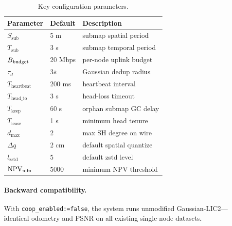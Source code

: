 \begin{table}[t]
  \centering
  \caption{Key configuration parameters.}
  \label{tab:config}
  \footnotesize
  \setlength{\tabcolsep}{3pt}
  \begin{tabular}{@{}p{2.2cm}p{1.1cm}p{4.5cm}@{}}
    \toprule
    Parameter & Default & Description \\
    \midrule
    $S_{\text{sub}}$       & 5 m    & submap spatial period \\
    $T_{\text{sub}}$       & 3 s    & submap temporal period \\
    $B_{\text{budget}}$             & 20 Mbps & per-node uplink budget \\
    $\tau_d$               & $3\bar{s}$ & Gaussian dedup radius \\
    $T_{\text{heartbeat}}$ & 200 ms & heartbeat interval \\
    $T_{\text{head\_to}}$  & 3 s    & head-loss timeout \\
    $T_{\text{keep}}$      & 60 s   & orphan submap GC delay \\
    $T_{\text{lease}}$     & 1 s    & minimum head tenure \\
    $d_{\max}$             & 2      & max SH degree on wire \\
    $\Delta q$             & 2 cm   & default spatial quantize \\
    $l_{\text{zstd}}$      & 5      & default zstd level \\
    $\text{NPV}_{\min}$          & 5000   & minimum NPV threshold \\
    \bottomrule
  \end{tabular}
\end{table}

\paragraph{Backward compatibility.} With \texttt{coop\_enabled:=false}, the
system runs unmodified Gaussian-LIC2---identical odometry and PSNR on all
existing single-node datasets.

